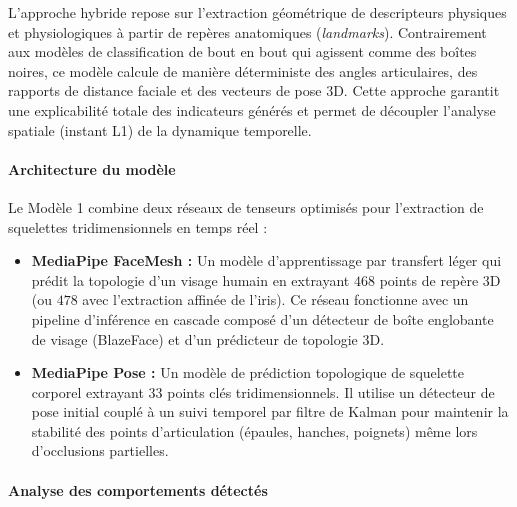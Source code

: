 L'approche hybride repose sur l'extraction géométrique de descripteurs physiques et physiologiques à partir de repères anatomiques (\textit{landmarks}). Contrairement aux modèles de classification de bout en bout qui agissent comme des boîtes noires, ce modèle calcule de manière déterministe des angles articulaires, des rapports de distance faciale et des vecteurs de pose 3D. Cette approche garantit une explicabilité totale des indicateurs générés et permet de découpler l'analyse spatiale (instant L1) de la dynamique temporelle.

\paragraph{Architecture du modèle}

Le Modèle 1 combine deux réseaux de tenseurs optimisés pour l'extraction de squelettes tridimensionnels en temps réel :
\begin{itemize}
    \item \textbf{MediaPipe FaceMesh :} Un modèle d'apprentissage par transfert léger qui prédit la topologie d'un visage humain en extrayant $468$ points de repère 3D (ou $478$ avec l'extraction affinée de l'iris). Ce réseau fonctionne avec un pipeline d'inférence en cascade composé d'un détecteur de boîte englobante de visage (BlazeFace) et d'un prédicteur de topologie 3D.
    \item \textbf{MediaPipe Pose :} Un modèle de prédiction topologique de squelette corporel extrayant $33$ points clés tridimensionnels. Il utilise un détecteur de pose initial couplé à un suivi temporel par filtre de Kalman pour maintenir la stabilité des points d'articulation (épaules, hanches, poignets) même lors d'occlusions partielles.
\end{itemize}

\paragraph{Analyse des comportements détectés}


